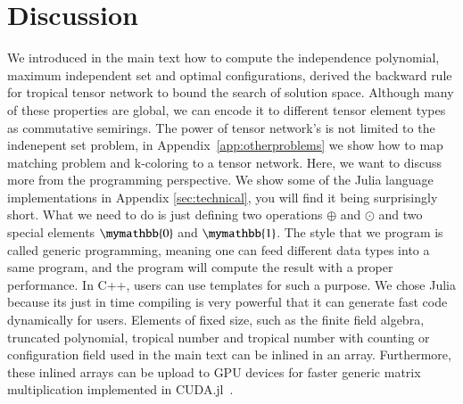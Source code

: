 \documentclass[review,onefignum,onetabnum]{siamart190516}
\newcommand{\<}{\langle}
\renewcommand{\>}{\rangle}
\newcommand{\App}[1]{Appendix~\ref{#1}}
\begin{document}
\section{Discussion}
We introduced in the main text how to compute the independence polynomial, maximum independent set and optimal configurations,
derived the backward rule for tropical tensor network to bound the search of solution space.
Although many of these properties are global,
we can encode it to different tensor element types as commutative semirings.
The power of tensor network's is not limited to the indenepent set problem, in \App{app:otherproblems} we show how to map matching problem and k-coloring to a tensor network.
Here, we want to discuss more from the programming perspective.
We show some of the Julia language~\cite{Bezanson2012} implementations in Appendix \ref{sec:technical}, you will find it being surprisingly short.
What we need to do is just defining two operations $\oplus$ and $\odot$ and two special elements $\mymathbb{0}$ and $\mymathbb{1}$.
The style that we program is called generic programming,
meaning one can feed different data types into a same program, and the program will compute the result with a proper performance.
In C++, users can use templates for such a purpose.
We chose Julia because its just in time compiling is very powerful that it can generate fast code dynamically for users.
Elements of fixed size, such as the finite field algebra, truncated polynomial, tropical number and tropical number with counting or configuration field used in the main text can be inlined in an array.
Furthermore, these inlined arrays can be upload to GPU devices for faster generic matrix multiplication implemented in CUDA.jl~\cite{Besard2018}.
\end{document}
